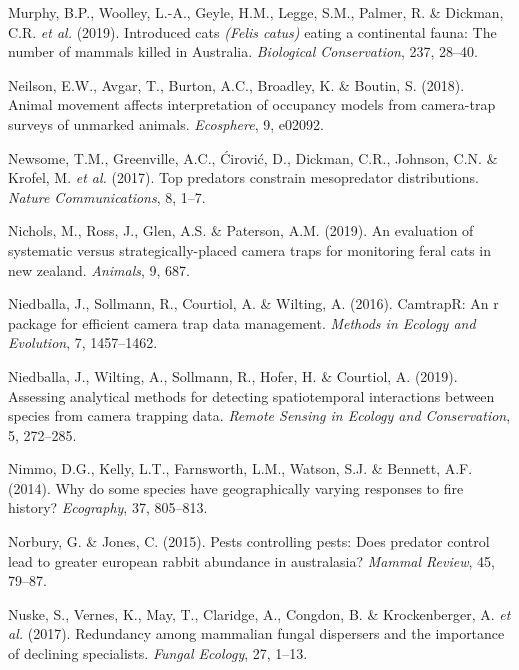 \documentclass[11pt,a4paper,titlepage,twoside,openright]{style/unimelbthesis}
\begin{document}
\begin{mainmatter}
\leavevmode\hypertarget{ref-murphy2019introduced}{}%
Murphy, B.P., Woolley, L.-A., Geyle, H.M., Legge, S.M., Palmer, R. \& Dickman, C.R. \emph{et al.} (2019). Introduced cats \emph{(Felis catus)} eating a continental fauna: The number of mammals killed in Australia. \emph{Biological Conservation}, 237, 28--40.

\leavevmode\hypertarget{ref-neilson2018animal}{}%
Neilson, E.W., Avgar, T., Burton, A.C., Broadley, K. \& Boutin, S. (2018). Animal movement affects interpretation of occupancy models from camera-trap surveys of unmarked animals. \emph{Ecosphere}, 9, e02092.

\leavevmode\hypertarget{ref-newsome2017top}{}%
Newsome, T.M., Greenville, A.C., Ćirović, D., Dickman, C.R., Johnson, C.N. \& Krofel, M. \emph{et al.} (2017). Top predators constrain mesopredator distributions. \emph{Nature Communications}, 8, 1--7.

\leavevmode\hypertarget{ref-nichols2019evaluation}{}%
Nichols, M., Ross, J., Glen, A.S. \& Paterson, A.M. (2019). An evaluation of systematic versus strategically-placed camera traps for monitoring feral cats in new zealand. \emph{Animals}, 9, 687.

\leavevmode\hypertarget{ref-niedballa2016}{}%
Niedballa, J., Sollmann, R., Courtiol, A. \& Wilting, A. (2016). CamtrapR: An r package for efficient camera trap data management. \emph{Methods in Ecology and Evolution}, 7, 1457--1462.

\leavevmode\hypertarget{ref-niedballa2019assessing}{}%
Niedballa, J., Wilting, A., Sollmann, R., Hofer, H. \& Courtiol, A. (2019). Assessing analytical methods for detecting spatiotemporal interactions between species from camera trapping data. \emph{Remote Sensing in Ecology and Conservation}, 5, 272--285.

\leavevmode\hypertarget{ref-nimmo2014why}{}%
Nimmo, D.G., Kelly, L.T., Farnsworth, L.M., Watson, S.J. \& Bennett, A.F. (2014). Why do some species have geographically varying responses to fire history? \emph{Ecography}, 37, 805--813.

\leavevmode\hypertarget{ref-norbury2015pests}{}%
Norbury, G. \& Jones, C. (2015). Pests controlling pests: Does predator control lead to greater european rabbit abundance in australasia? \emph{Mammal Review}, 45, 79--87.

\leavevmode\hypertarget{ref-nuske2017redundancy}{}%
Nuske, S., Vernes, K., May, T., Claridge, A., Congdon, B. \& Krockenberger, A. \emph{et al.} (2017). Redundancy among mammalian fungal dispersers and the importance of declining specialists. \emph{Fungal Ecology}, 27, 1--13.


\end{mainmatter}
\end{document}
